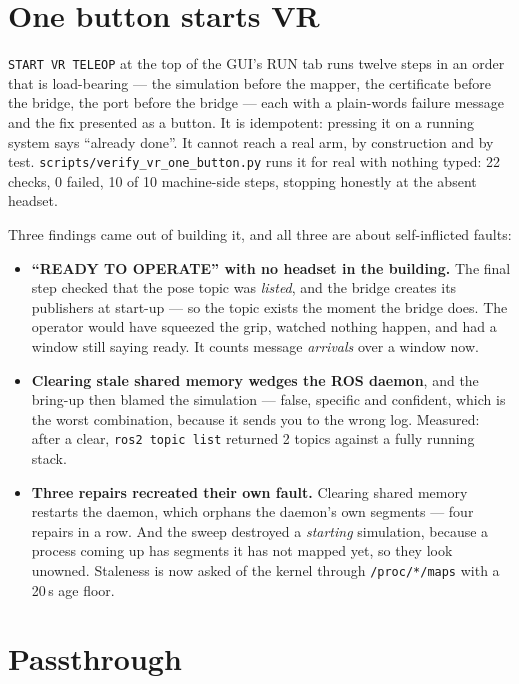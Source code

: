 \documentclass[11pt,a4paper,oneside]{report}
\newcommand{\code}[1]{\texttt{\small #1}}
\newcommand{\file}[1]{\texttt{\small #1}}
\begin{document}
\section{One button starts VR}

\code{START VR TELEOP} at the top of the GUI's RUN tab runs twelve steps in an
order that is load-bearing --- the simulation before the mapper, the certificate
before the bridge, the port before the bridge --- each with a plain-words
failure message and the fix presented as a button. It is idempotent: pressing
it on a running system says ``already done''. It cannot reach a real arm, by
construction and by test. \file{scripts/verify\_vr\_one\_button.py} runs it for
real with nothing typed: 22 checks, 0 failed, 10 of 10 machine-side steps,
stopping honestly at the absent headset.

Three findings came out of building it, and all three are about self-inflicted
faults:

\begin{itemize}
\item \textbf{``READY TO OPERATE'' with no headset in the building.} The final
      step checked that the pose topic was \emph{listed}, and the bridge
      creates its publishers at start-up --- so the topic exists the moment the
      bridge does. The operator would have squeezed the grip, watched nothing
      happen, and had a window still saying ready. It counts message
      \emph{arrivals} over a window now.
\item \textbf{Clearing stale shared memory wedges the ROS daemon}, and the
      bring-up then blamed the simulation --- false, specific and confident,
      which is the worst combination, because it sends you to the wrong log.
      Measured: after a clear, \code{ros2 topic list} returned 2 topics against
      a fully running stack.
\item \textbf{Three repairs recreated their own fault.} Clearing shared memory
      restarts the daemon, which orphans the daemon's own segments --- four
      repairs in a row. And the sweep destroyed a \emph{starting} simulation,
      because a process coming up has segments it has not mapped yet, so they
      look unowned. Staleness is now asked of the kernel through
      \file{/proc/*/maps} with a 20\,s age floor.
\end{itemize}

\section{Passthrough}
\end{document}
